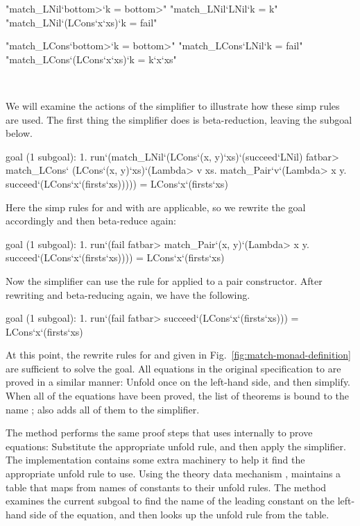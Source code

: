 \noindent
\begin{minipage}[h]{0.5\linewidth}
\begin{isacode}
  "match_LNil`\<bottom>`k = \<bottom>"
  "match_LNil`LNil`k = k"
  "match_LNil`(LCons`x`xs)`k = fail"
\end{isacode}
\end{minipage}
\begin{minipage}[h]{0.49\linewidth}
\begin{isacode}
  "match_LCons`\<bottom>`k = \<bottom>"
  "match_LCons`LNil`k = fail"
  "match_LCons`(LCons`x`xs)`k = k`x`xs"
\end{isacode}
\end{minipage} \\
\unmedskip

We will examine the actions of the simplifier to illustrate how these simp rules are used. The first thing the simplifier does is beta-reduction, leaving the subgoal below.
%
\begin{isacode}
goal (1 subgoal):
 1. run`(match_LNil`(LCons`(x, y)`xs)`(succeed`LNil) \<fatbar> match_LCons`
    (LCons`(x, y)`xs)`(\<Lambda> v xs. match_Pair`v`(\<Lambda> x y. succeed`(LCons`x`(firsts`xs)))))
  = LCons`x`(firsts`xs)
\end{isacode}
%
Here the simp rules for  and  with  are applicable, so we rewrite the goal accordingly and then beta-reduce again:
%
\begin{isacode}
goal (1 subgoal):
 1. run`(fail \<fatbar> match_Pair`(x, y)`(\<Lambda> x y. succeed`(LCons`x`(firsts`xs))))
  = LCons`x`(firsts`xs)
\end{isacode}
%
Now the simplifier can use the rule for  applied to a pair constructor. After rewriting and beta-reducing again, we have the following.
%
\begin{isacode}
goal (1 subgoal):
 1. run`(fail \<fatbar> succeed`(LCons`x`(firsts`xs))) = LCons`x`(firsts`xs)
\end{isacode}
%
At this point, the rewrite rules for  and  given in Fig.~\ref{fig:match-monad-definition} are sufficient to solve the goal. All equations in the original specification to {\fixrec} are proved in a similar manner: Unfold once on the left-hand side, and then simplify. When all of the equations have been proved, the list of theorems is bound to the name ; {\fixrec} also adds all of them to the simplifier.

The  method performs the same proof steps that {\fixrec} uses internally to prove equations: Substitute the appropriate unfold rule, and then apply the simplifier. The implementation contains some extra machinery to help it find the appropriate unfold rule to use. Using the theory data mechanism \cite{WW07}, {\fixrec} maintains a table that maps from names of constants to their unfold rules. The  method examines the current subgoal to find the name of the leading constant on the left-hand side of the equation, and then looks up the unfold rule from the table.

